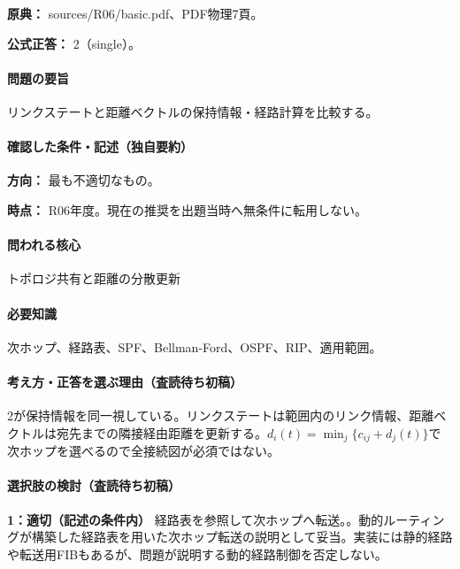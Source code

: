 \noindent\textbf{原典：} sources/R06/basic.pdf、PDF物理7頁。

\textbf{公式正答：} 2（single）。

\paragraph{問題の要旨} リンクステートと距離ベクトルの保持情報・経路計算を比較する。

\paragraph{確認した条件・記述（独自要約）}\mbox{}\par

\noindent\textbf{方向：} 最も不適切なもの。\par

\noindent\textbf{時点：} R06年度。現在の推奨を出題当時へ無条件に転用しない。\par

\paragraph{問われる核心} トポロジ共有と距離の分散更新

\paragraph{必要知識} 次ホップ、経路表、SPF、Bellman-Ford、OSPF、RIP、適用範囲。

\paragraph{考え方・正答を選ぶ理由（査読待ち初稿）} 2が保持情報を同一視している。リンクステートは範囲内のリンク情報、距離ベクトルは宛先までの隣接経由距離を更新する。\(d_i(t)=\min_j\{c_{ij}+d_j(t)\}\)で次ホップを選べるので全接続図が必須ではない。

\paragraph{選択肢の検討（査読待ち初稿）}\mbox{}\par

\noindent\textbf{1：適切（記述の条件内）} 経路表を参照して次ホップへ転送。。動的ルーティングが構築した経路表を用いた次ホップ転送の説明として妥当。実装には静的経路や転送用FIBもあるが、問題が説明する動的経路制御を否定しない。\par

